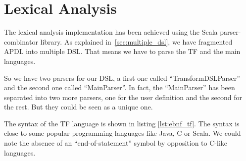 \section{Lexical Analysis}
\label{sec:lexical_analysis}

The lexical analysis implementation has been achieved using the Scala
parser-combinator library\cite{Odersky:2016:PSU:2988396}. As explained
in~\ref{sec:multiple_dsl}, we have fragmented \gls{APDL} into multiple
\gls{DSL}. That means we have to parse the \gls{TF} and the main
languages.

So we have two parsers for our \gls{DSL}, a first one called
``TransformDSLParser'' and the second one called ``MainParser''. In fact, the
``MainParser'' has been separated into two more parsers, one for the user
definition and the second for the rest. But they could be seen as a unique one.

The syntax of the \gls{TF} language is shown in listing \ref{lst:ebnf_tf}. The
syntax is close to some popular programming languages like Java, C or Scala. We
could note the absence of an ``end-of-statement'' symbol by opposition to C-like
languages.

